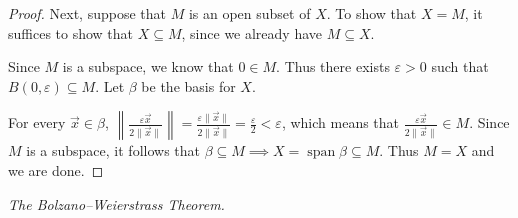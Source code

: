 \documentclass{article}
\theoremstyle{plain} %
\numberwithin{thm}{section} %
\theoremstyle{definition}
\begin{document}
\begin{enumerate}[label=(\alph*)]
\begin{proof}
            Next, suppose that \(M\) is an open subset of \(X\). To show that \(X=M\), it suffices to show that \(X \subseteq M\), since we already have \(M \subseteq X\).

            Since \(M\) is a subspace, we know that \(0 \in M\). Thus there exists \(\varepsilon > 0\) such that \(B(0, \varepsilon) \subseteq M\). Let \(\beta\) be the basis for \(X\).
            
            For every \(\vec{x} \in \beta\), \(\left\lVert \frac{\varepsilon \vec{x}}{2\|\vec{x}\|} \right\rVert = \frac{\varepsilon\|\vec{x}\|}{2\|\vec{x}\|} = \frac{\varepsilon}{2} < \varepsilon\), which means that \(\frac{\varepsilon \vec{x}}{2\|\vec{x}\|} \in M\). Since \(M\) is a subspace, it follows that \(\beta \subseteq M \implies X = \operatorname{span} \beta \subseteq M\). Thus \(M=X\) and we are done.

        \end{proof}
    \end{enumerate}

    \exercise \textit{The Bolzano--Weierstrass Theorem.}
\end{document}
